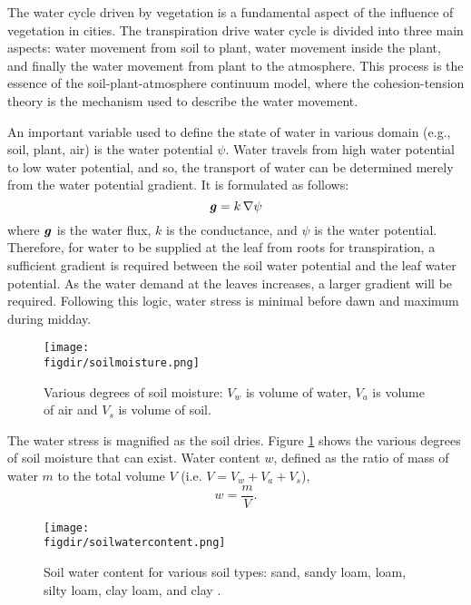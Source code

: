 The water cycle driven by vegetation is a fundamental aspect of the influence of vegetation in cities. The transpiration drive water cycle is divided into three main aspects: water movement from soil to plant, water movement inside the plant, and finally the water movement from plant to the atmosphere. This process is the essence of the soil-plant-atmosphere continuum model, where the cohesion-tension theory is the mechanism used to describe the water movement. 

An important variable used to define the state of water in various domain (e.g., soil, plant, air) is the water potential $\psi$. Water travels from high water potential to low water potential, and so, the transport of water can be determined merely from the water potential gradient. It is formulated as follows:
\begin{equation}
\textbf{\textit{g}} = k\,\nabla \psi
\end{equation}
where $\textbf{\textit{g}}$ is the water flux, $k$ is the conductance, and $\psi$ is the water potential. Therefore, for water to be supplied at the leaf from roots for transpiration, a sufficient gradient is required between the soil water potential and the leaf water potential. As the water demand at the leaves increases, a larger gradient will be required. Following this logic, water stress is minimal before dawn and maximum during midday. 

\begin{figure}[h]
	\centering
	\texttt{[image: \\figdir/soilmoisture.png]}
	\caption{Various degrees of soil moisture: $V_w$ is volume of water, $V_a$ is volume of air and $V_s$ is volume of soil.}
	\label{fig:soilmoisture}
\end{figure}

The water stress is magnified as the soil dries. Figure \ref{fig:soilmoisture} shows the various degrees of soil moisture that can exist. Water content $w$, defined as the ratio of mass of water $m$ to the total volume $V$ (i.e. $V=V_w+V_a+V_s$),
\begin{equation}
w = \frac{m}{V}.
\end{equation}


\begin{figure}[t]
	\centering
	\texttt{[image: \\figdir/soilwatercontent.png]}
	\caption{Soil water content for various soil types: sand, sandy loam, loam, silty loam, clay loam, and clay \citep{nobel2009physicochemical}. }
	\label{fig:soilwatercontent}
\end{figure}

